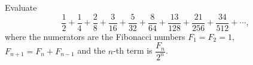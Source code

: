 Evaluate
\[
\dfrac{1}{2}+\dfrac{1}{4}+\dfrac{2}{8}+\dfrac{3}{16}+\dfrac{5}{32}+\dfrac{8}{64}+\dfrac{13}{128}+\dfrac{21}{256}+\dfrac{34}{512}+\cdots,
\]
where the numerators are the Fibonacci numbers $F_1=F_2=1$, $F_{n+1}=F_n+F_{n-1}$ and the $n$-th term is $\dfrac{F_n}{2^n}$.

